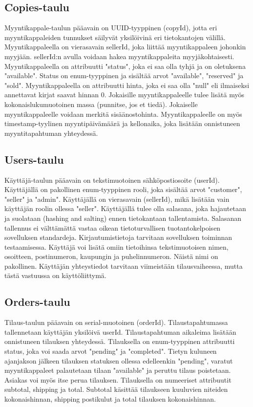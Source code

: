 \documentclass[11pt,a4paper]{article}
\begin{document}
\subsection{Copies-taulu}

Myyntikappale-taulun pääavain on UUID-tyyppinen (copyId), jotta eri myyntikappaleiden tunnukset säilyvät yksilöivinä eri tietokantojen välillä. Myyntikappaleella on vierasavain sellerId, joka liittää myyntikappaleen johonkin myyjään. sellerId:n avulla voidaan hakea myyntikappaleita myyjäkohtaisesti. Myyntikappaleella on attribuutti "status", joka ei saa olla tyhjä ja on oletuksena "available". Status on enum-tyyppinen ja sisältää arvot "available", "reserved" ja "sold". Myyntikappaleella on attribuutti hinta, joka ei saa olla "null" eli ilmaiseksi annettavat kirjat saavat hinnan 0. Jokaisille myyntikappaleelle tulee lisätä myös kokonaislukumuotoinen massa (punnitse, jos et tiedä). Jokaiselle myyntikappaleelle voidaan merkitä sisäänostohinta. Myyntikappaleelle on myös timestamp-tyylinen myyntipäivämäärä ja kellonaika, joka lisätään onnistuneen myyntitapahtuman yhteydessä.

\subsection{Users-taulu}

Käyttäjä-taulun pääavain on tekstimuotoinen sähköpostiosoite (userId). Käyttäjällä on pakollinen enum-tyyppinen rooli, joka sisältää arvot "customer", "seller" ja "admin". Käyttäjällä on vierasavain (sellerId), mikä lisätään vain käyttäjän roolin ollessa "seller". Käyttäjällä tulee olla salasana, joka hajautetaan ja suolataan (hashing and salting) ennen tietokantaan tallentamista. Salasanan tallennus ei välttämättä vastaa oikean tietoturvallisen tuotantokelpoisen sovelluksen standardeja. Kirjautumistietoja tarvitaan sovelluksen toiminnan testaamisessa. Käyttäjä voi lisätä omiin tietoihinsa tekstimuotoisen nimen, osoitteen, postinumeron, kaupungin ja puhelinnumeron. Näistä nimi on pakollinen. Käyttäjän yhteystiedot tarvitaan viimeistään tilausvaiheessa, mutta tästä vastuussa on käyttöliittymä.

\subsection{Orders-taulu}

Tilaus-taulun pääavain on serial-muotoinen (orderId). Tilaustapahtumassa tallennetaan käyttäjän yksilöivä userId. Tilaustapahtuman aikaleima lisätään onnistuneen tilauksen yhteydessä. Tilauksella on enum-tyyppinen attribuutti status, joka voi saada arvot "pending" ja "completed". Tietyn kuluneen ajanjakson jälkeen tilauksen statuksen ollessa edelleenkin "pending", varatut myyntikappaleet palautetaan tilaan "available" ja peruttu tilaus poistetaan. Asiakas voi myös itse perua tilauksen. Tilauksella on numeeriset attribuutit subtotal, shipping ja total. Subtotal käsittää tilaukseen kuuluvien niteiden kokonaishinnan, shipping postikulut ja total tilauksen kokonaishinnan.
\end{document}
